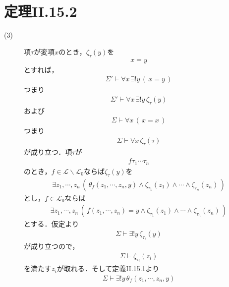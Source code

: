 \documentclass[a4j,10.5pt,oneside,openany]{jsbook}
\theoremstyle{mystyle}
\begin{document}
\section{定理I\hspace{-.1em}I.15.2}
	\begin{description}
		\item[(3)]
			項$\tau$が変項$x$のとき，$\zeta_{\tau}(y)$を
			\begin{align}
				x = y
			\end{align}
			とすれば，
			\begin{align}
				\Sigma' \vdash \forall x\, \exists! y\, (\, x=y\, )
			\end{align}
			つまり
			\begin{align}
				\Sigma' \vdash \forall x\, \exists! y\, \zeta_{\tau}(y)
			\end{align}
			および
			\begin{align}
				\Sigma \vdash \forall x\, (\, x=x\, )
			\end{align}
			つまり
			\begin{align}
				\Sigma \vdash \forall x\, \zeta_{\tau}(\tau)
			\end{align}
			が成り立つ．項$\tau$が
			\begin{align}
				f\tau_{1}\cdots\tau_{n}
			\end{align}
			のとき，$f \in \mathcal{L} \backslash \mathcal{L}_{0}$ならば$\zeta_{\tau}(y)$を
			\begin{align}
				\exists z_{1}, \cdots, z_{n}\, \left(\, 
				\theta_{f}(z_{1},\cdots,z_{n},y) \wedge \zeta_{\tau_{1}}(z_{1}) \wedge
				\cdots \wedge \zeta_{\tau_{n}}(z_{n})\, \right)
			\end{align}
			とし，$f \in \mathcal{L}_{0}$ならば
			\begin{align}
				\exists z_{1}, \cdots, z_{n}\, \left(\, 
				f(z_{1},\cdots,z_{n}) = y \wedge \zeta_{\tau_{1}}(z_{1}) \wedge
				\cdots \wedge \zeta_{\tau_{n}}(z_{n})\, \right)
			\end{align}
			とする．仮定より
			\begin{align}
				\Sigma \vdash \exists! y\, \zeta_{\tau_{i}}(y)
			\end{align}
			が成り立つので，
			\begin{align}
				\Sigma \vdash \zeta_{\tau_{i}}(z_{i})
			\end{align}
			を満たす$z_{i}$が取れる．そして定義I\hspace{-.1em}I.15.1より
			\begin{align}
				\Sigma \vdash \exists!y\, \theta_{f}(z_{1},\cdots,z_{n},y)

\end{align}
\end{description}
\end{document}
